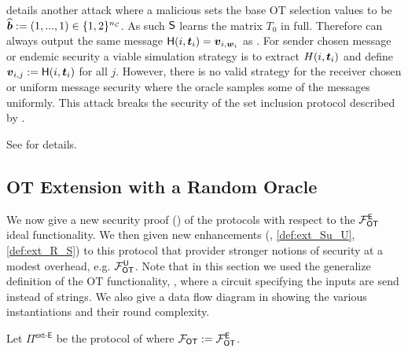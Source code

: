  details another attack where a malicious \send sets the base OT selection values to be $\widehat\bb:=(1,...,1)\in \{1,2\}^\nc$. As such $\send$ learns the matrix $T_0$ in full. Therefore \send can always output the same message $\H(i, \tt_i)=\vv_{i,\ww_i}$ as \rec. For sender chosen message or endemic security a viable simulation strategy is to extract $H(i, \tt_i)$ and define $\vv_{i,j}:=\H(i, \tt_i)$ for all $j$. However, there is no valid strategy for the receiver chosen or uniform message security where the oracle samples some of the messages uniformly. This attack breaks the security of the set inclusion protocol described by \cite[Figure 5]{RSA:OrrOrsSch17}.
\iffullversion

\else
See  for details.
\fi





\subsection{OT Extension with a Random Oracle}\label{sec:extSec}

We now give a new security proof () of the \cite{C:KelOrsSch15,RSA:OrrOrsSch17} protocols with respect to the $\OOT^\E$ ideal functionality. We then given new enhancements (, \ref{def:ext_Su_U}, \ref{def:ext_R_S}) to this protocol that provider stronger notions of security at a modest overhead, e.g. $\OOT^\U$. Note that in this section we used the generalize definition of the OT functionality, , where a circuit specifying the inputs are send instead of strings. We also give a data flow diagram in  showing the various instantiations and their round complexity.


\begin{definition}\label{def:ext_E_E}
	Let $\Pi^{\textsf{ext-E}}$ be the protocol of  where $\OOT:=\OOT^\E$.
\end{definition}



